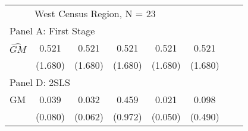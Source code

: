 \begin{tabular}{l*{7}{c}}
\cmidrule(lr){1-6}
\multicolumn{5}{c}{West Census Region, N = 23}\\\cmidrule(lr){1-6}
\multicolumn{5}{l}{Panel A: First Stage}\\
\cmidrule(lr){1-6}
$\widehat{GM}$  &    0.521   &    0.521   &    0.521   &    0.521   &    0.521   \\
                &  (1.680)   &  (1.680)   &  (1.680)   &  (1.680)   &  (1.680)   \\
\cmidrule(lr){1-6}
\multicolumn{5}{l}{Panel D: 2SLS}\\
\cmidrule(lr){1-6}
GM              &    0.039   &    0.032   &    0.459   &    0.021   &    0.098   \\
                &  (0.080)   &  (0.062)   &  (0.972)   &  (0.050)   &  (0.490)   \\
     \bottomrule \end{tabular}
